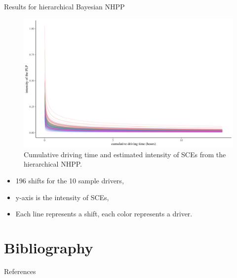 \documentclass[aspectratio=43]{beamer}
\begin{document}
\begin{frame}{Results for hierarchical Bayesian NHPP}
\begin{figure}
  \includegraphics[height=0.45\textheight]{Figures/fit_plp.png}
  \caption{Cumulative driving time and estimated intensity of SCEs from the hierarchical NHPP.}
\end{figure}
\begin{itemize}
    \item 196 shifts for the 10 sample drivers,
    \item y-axis is the intensity of SCEs,
    \item Each line represents a shift, each color represents a driver.
\end{itemize}
\end{frame}



\section*{Bibliography}
\begin{frame}[allowframebreaks]{References}%
\tiny{
	
	
	}
\end{frame}

\maketitle
\end{document}

